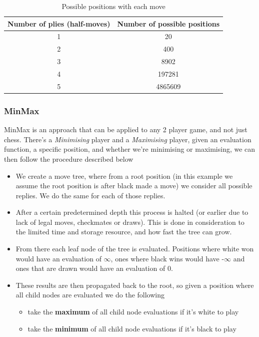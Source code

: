 \begin{table}[H]
    \centering
    \begin{tabular}{ ||c c|| } 
      \hline
      Number of plies (half-moves) & Number of possible positions\\ 
      \hline\hline
      1 & 20 \\ 
      \hline
      2 & 400 \\
      \hline
      3 & 8902 \\
      \hline
      4 & 197281 \\
      \hline
      5 & 4865609 \\
      \hline
    \end{tabular}
    \caption{Possible positions with each move}
    \label{tab:posTable}
\end{table}

\subsubsection{MinMax}
MinMax is an approach that can be applied to any 2 player game, and not just chess. There's a \textit{Minimising} player and a \textit{Maximising} player, given an evaluation function, a specific position, and whether we're minimising or maximising, we can then follow the procedure described below \cite{Klein}

\begin{itemize}
    \item We create a move tree, where from a root position (in this example we assume the root position is after black made a move) we consider all possible replies. We do the same for each of those replies.
    \item After a certain predetermined depth this process is halted (or earlier due to lack of legal moves, checkmates or draws). This is done in consideration to the limited time and storage resource, and how fast the tree can grow.
    \item From there each leaf node of the tree is evaluated. Positions where white won would have an evaluation of $\infty$, ones where black wins would have -$\infty$ and ones that are drawn would have an evaluation of 0.
    \item These results are then propagated back to the root, so given a position where all child nodes are evaluated we do the following
        \begin{itemize}
            \item take the \textbf{maximum} of all child node evaluations if it's white to play
            \item take the \textbf{minimum} of all child node evaluations if it's black to play
        \end{itemize}
\end{itemize}

